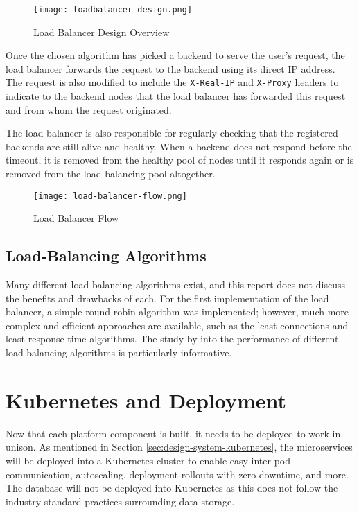 \begin{figure}[htbp]
\texttt{[image: loadbalancer-design.png]}
\centering
\caption{Load Balancer Design Overview}
\label{fig:loadbalancer-design}
\end{figure}

Once the chosen algorithm has picked a backend to serve the user's request, the load balancer forwards the request to the backend using its direct IP address.
The request is also modified to include the \verb|X-Real-IP| and \verb|X-Proxy| headers to indicate to the backend nodes that the load balancer has forwarded this request and from whom the request originated. 

The load balancer is also responsible for regularly checking that the registered backends are still alive and healthy. When a backend does not respond before the timeout, it is removed from the healthy pool of nodes until it responds again or is removed from the load-balancing pool altogether.

\begin{figure}[htbp]
\texttt{[image: load-balancer-flow.png]}
\centering
\caption{Load Balancer Flow}
\label{fig:loadbalancer-flow}
\end{figure}

\subsection{Load-Balancing Algorithms}
Many different load-balancing algorithms exist, and this report does not discuss the benefits and drawbacks of each.
For the first implementation of the load balancer, a simple round-robin algorithm was implemented; however, much more complex and efficient approaches are available, such as the least connections and least response time algorithms.
The study by \citeauthor{sharma2008performance} into the performance of different load-balancing algorithms is particularly informative.

\section{Kubernetes and Deployment}
Now that each platform component is built, it needs to be deployed to work in unison. As mentioned in Section \ref{sec:design-system-kubernetes}, the microservices will be deployed into a Kubernetes cluster to enable easy inter-pod communication, autoscaling, deployment rollouts with zero downtime, and more.
The database will not be deployed into Kubernetes as this does not follow the industry standard practices surrounding data storage. 

